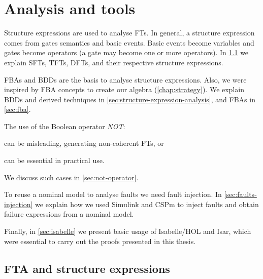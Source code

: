 \documentclass[12pt,openright,twoside,a4paper,oldfontcommands,english,brazil,final]{abntex2}
\theoremstyle{theo}
\newcommand{\simulink}{Simulink\xspace}
\begin{document}
\chapter{Analysis and tools}
\label{chap:analysis}

Structure expressions are used to analyse \aclp{FT}.
In general, a structure expression comes from gates semantics and basic events.
Basic events become variables and gates become operators (a gate may become one or more operators).
In \cref{sec:fault-trees} we explain \acp{SFT}, \acp{TFT}, \acp{DFT}, and their respective structure expressions.

\Acp{FBA} and \acp{BDD} are the basis to analyse structure expressions.
Also, we were inspired by \ac{FBA} concepts to create our \acl{algebra} (\cref{chap:strategy}).
We explain \acp{BDD} and derived techniques in \cref{sec:structure-expression-analysis}, and \acp{FBA} in \cref{sec:fba}.

The use of the Boolean operator \emph{NOT}:
\begin{alineasinline}
  \item can be misleading, generating non-coherent \aclp{FT}, or
  \item can be essential in practical use.
\end{alineasinline}
We discuss such cases in \cref{sec:not-operator}.

To reuse a nominal model to analyse faults we need fault injection.
In \cref{sec:faults-injection} we explain how we used \simulink and \ac{CSPm} to inject faults and obtain failure expressions from a nominal model.

Finally, in \cref{sec:isabelle} we present basic usage of Isabelle/HOL and \ac{Isar}, which were essential to carry out the proofs presented in this thesis.

\section{\Acl*{FTA} and structure expressions}
\label{sec:fault-trees}
\end{document}
